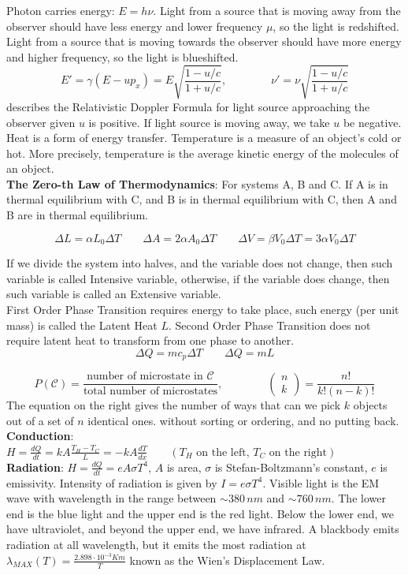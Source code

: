 \documentclass[10pt]{article}
\theoremstyle{break}
\theoremstyle{break}
\newcommand{\C}{\mathcal{C}}
\newcommand{\ee}{\cdot 10}
\begin{document}
Photon carries energy: $E = h\nu$. Light from a source that is moving away from the observer should have less energy and lower frequency $\mu$, so the light is redshifted. Light from a source that is moving towards the observer should have more energy and higher frequency, so the light is blueshifted. 
$$E'=\gamma(E-up_x) = E\sqrt{\frac{1-u/c}{1+u/c}},\qquad\qquad \nu' = \nu \sqrt{\frac{1-u/c}{1+u/c}}$$
describes the Relativistic Doppler Formula for light source approaching the observer given $u$ is positive. If light source is moving away, we take $u$ be negative. \\

\hfill\break
Heat is a form of energy transfer. Temperature is a measure of an object's cold or hot. More precisely, temperature is the average kinetic energy of the molecules of an object.\\

\textbf{The Zero-th Law of Thermodynamics}: For systems A, B and C. If A is in thermal equilibrium with C, and B is in thermal equilibrium with C, then A and B are in thermal equilibrium.

$$\Delta L =\alpha L_0 \Delta T \qquad \Delta A = 2\alpha A_0 \Delta T \qquad \Delta V = \beta V_0 \Delta T = 3\alpha V_0 \Delta T$$

If we divide the system into halves, and the variable does not change, then such variable is called Intensive variable, otherwise, if the variable does change, then such variable is called an Extensive variable.\\

First Order Phase Transition requires energy to take place, such energy (per unit mass) is called the Latent Heat $L$. Second Order Phase Transition does not require latent heat to transform from one phase to another. 
$$\Delta Q = m c_p \Delta T \qquad \Delta Q = m L$$

$$P(\C) = \frac{\text{number of microstate in }\C}{\text{total number of microstates}},\qquad\qquad \begin{pmatrix}
n\\k
\end{pmatrix} = \frac{n!}{k!(n-k)!}$$
The equation on the right gives the number of ways that can we pick $k$ objects out of a set of $n$ identical ones. without sorting or ordering, and no putting back.\\


\textbf{Conduction}: $H = \frac{dQ}{dt} =kA\frac{T_H - T_C}{L}= -kA \frac{dT}{dx} \qquad(T_H \text{ on the left, }T_C \text{ on the right})$\\
\textbf{Radiation}: $H = \frac{dQ}{dt} = eA\sigma T^4$, $A$ is area, $\sigma$ is Stefan-Boltzmann's constant, $e$ is emissivity. Intensity of radiation is given by $I = e\sigma T^4$. Visible light is the EM wave with wavelength in the range between $\sim 380\,nm$ and $\sim 760\,nm$. The lower end is the blue light and the upper end is the red light. Below the lower end, we have ultraviolet, and beyond the upper end, we have infrared.  A blackbody emits radiation at all wavelength, but it emits the most radiation at $\lambda_{MAX}(T) = \frac{2.898\ee^{-3} Km}{T}$ known as the Wien's Displacement Law.\\
\end{document}
